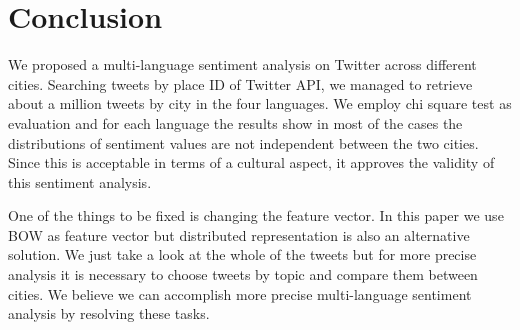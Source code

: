 \documentclass[twocolumn]{article}
\begin{document}
\vspace{-6mm}

\section{Conclusion}
\vspace{-2mm}
We proposed a multi-language sentiment analysis on Twitter across different cities.
Searching tweets by place ID of Twitter API, we managed to retrieve about a million tweets by city in the four languages.
We employ chi square test as evaluation and for each language the results show in most of the cases the distributions of sentiment values are not independent between the two cities.
Since this is acceptable in terms of a cultural aspect, it approves the validity of this sentiment analysis.

One of the things to be fixed is changing the feature vector.
In this paper we use BOW as feature vector but distributed representation is also an alternative solution.
We just take a look at the whole of the tweets but for more precise analysis it is necessary to choose tweets by topic and compare them between cities.
We believe we can accomplish more precise multi-language sentiment analysis by resolving these tasks.

\vspace{-6mm}


\end{document}
